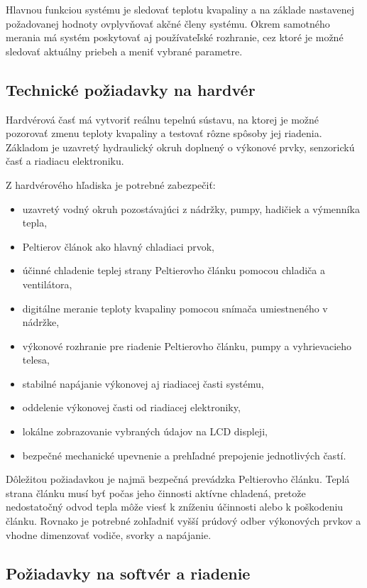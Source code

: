 Hlavnou funkciou systému je sledovať teplotu kvapaliny a na základe nastavenej požadovanej hodnoty 
ovplyvňovať akčné členy systému. Okrem samotného merania má systém poskytovať aj používateľské rozhranie, 
cez ktoré je možné sledovať aktuálny priebeh a meniť vybrané parametre.

\subsection{Technické požiadavky na hardvér}

Hardvérová časť má vytvoriť reálnu tepelnú sústavu, na ktorej je možné pozorovať zmenu teploty 
kvapaliny a testovať rôzne spôsoby jej riadenia. Základom je uzavretý hydraulický okruh doplnený 
o výkonové prvky, senzorickú časť a riadiacu elektroniku.

Z hardvérového hľadiska je potrebné zabezpečiť:

\begin{itemize}
    \item uzavretý vodný okruh pozostávajúci z nádržky, pumpy, hadičiek a výmenníka tepla,
    \item Peltierov článok ako hlavný chladiaci prvok,
    \item účinné chladenie teplej strany Peltierovho článku pomocou chladiča a ventilátora,
    \item digitálne meranie teploty kvapaliny pomocou snímača umiestneného v nádržke,
    \item výkonové rozhranie pre riadenie Peltierovho článku, pumpy a vyhrievacieho telesa,
    \item stabilné napájanie výkonovej aj riadiacej časti systému,
    \item oddelenie výkonovej časti od riadiacej elektroniky,
    \item lokálne zobrazovanie vybraných údajov na LCD displeji,
    \item bezpečné mechanické upevnenie a prehľadné prepojenie jednotlivých častí.
\end{itemize}

Dôležitou požiadavkou je najmä bezpečná prevádzka Peltierovho článku. Teplá strana článku musí byť 
počas jeho činnosti aktívne chladená, pretože nedostatočný odvod tepla môže viesť k zníženiu účinnosti 
alebo k poškodeniu článku. Rovnako je potrebné zohľadniť vyšší prúdový odber výkonových prvkov a vhodne 
dimenzovať vodiče, svorky a napájanie.

\subsection{Požiadavky na softvér a riadenie}

